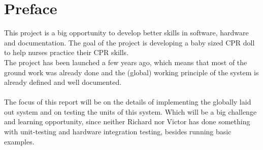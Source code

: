 \chapter*{Preface}
This project is a big opportunity to develop better skills in software, hardware and documentation. The goal of the project is developing a baby sized CPR doll to help nurses practice their CPR skills.\\ The project has been launched a few years ago, which means that most of the ground work was already done and the (global) working principle of the system is already defined and well documented. \\\\The focus of this report will be on the details of implementing the globally laid out system and on testing the units of this system. Which will be a big challenge and learning opportunity, since neither Richard nor Victor has done something with unit-testing and hardware integration testing, besides running basic examples. 